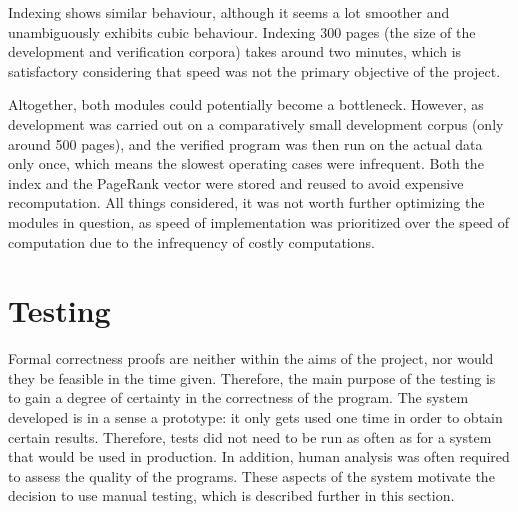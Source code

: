 \documentclass[12pt,notitlepage,twoside]{scrbook}
\begin{document}
Indexing shows similar behaviour, although it seems a lot smoother and unambiguously exhibits cubic
behaviour. Indexing 300 pages (the size of the development and verification corpora) takes around two minutes, which is satisfactory considering
that speed was not the primary objective of the project.

Altogether, both modules could potentially become a bottleneck. However, as development
was carried out on a comparatively small development corpus (only around 500 pages), and
the verified program was then run on the actual data only once, which means the slowest operating cases
were infrequent. Both the index and the PageRank vector were stored and reused to avoid
expensive recomputation. All things considered, it was not worth further optimizing the
modules in question, as speed of implementation was prioritized over the speed of
computation due to the infrequency of costly computations. 

\section{Testing}
Formal correctness proofs are neither within the aims of the project, nor would they be
feasible in the time given. Therefore, the main purpose of the testing is to gain a degree
of certainty in the correctness of the program. The system developed is in a sense a
prototype: it only gets used one time in order to obtain certain results. Therefore, tests
did not need to be run as often as for a system that would be used in production. In
addition, human analysis was often required to assess the quality of the programs. These
aspects of the system motivate the decision to use manual testing, which is described
further in this section. 
\end{document}
